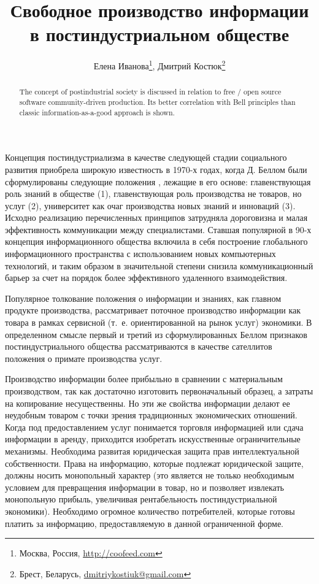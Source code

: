 \documentclass[10pt, a5paper]{article}
\begin{document}
\title{Свободное производство информации в постиндустриальном обществе}
\author{Елена Иванова\footnote{Москва, Россия, \url{http://coofeed.com}}, Дмитрий Костюк\footnote{Брест, Беларусь, \url{dmitriykostiuk@gmail.com}}}
\date{}
\maketitle
\begin{abstract}
The concept of postindustrial society is discussed in relation to free / open source software community-driven production. Its better correlation with Bell principles than classic information-as-a-good approach is shown. 
\end{abstract}

Концепция постиндустриализма в качестве следующей стадии социального развития приобрела широкую известность в 1970-х годах, когда Д. Беллом были сформулированы следующие положения \cite{ivanova1}, лежащие в его основе: главенствующая роль знаний в обществе (1), главенствующая роль производства не товаров, но услуг (2), университет как очаг производства новых знаний и инноваций (3). Исходно реализацию перечисленных принципов затрудняла дороговизна и малая эффективность коммуникации между специалистами. Ставшая популярной в 90-х концепция информационного общества \cite{ivanova2} включила в себя построение глобального информационного пространства с использованием новых компьютерных технологий, и таким образом в значительной степени снизила коммуникационный барьер за счет на порядок более эффективного удаленного взаимодействия.

Популярное толкование положения о информации и знаниях, как главном продукте производства, рассматривает поточное производство информации как товара в рамках сервисной (т. е. ориентированной на рынок услуг) экономики. В определенном смысле первый и третий из сформулированных Беллом признаков постиндустриального общества рассматриваются в качестве сателлитов положения о примате производства услуг. 

Производство информации более прибыльно в сравнении с материальным производством, так как достаточно изготовить первоначальный образец, а затраты на копирование несущественны. Но эти же свойства информации делают ее неудобным товаром с точки зрения традиционных экономических отношений. Когда под предоставлением услуг понимается торговля информацией или сдача информации в аренду, приходится изобретать искусственные ограничительные механизмы. Необходима развитая юридическая защита прав интеллектуальной собственности. Права на информацию, которые подлежат юридической защите, должны носить монопольный характер (это является не только необходимым условием для превращения информации в товар, но и позволяет извлекать монопольную прибыль, увеличивая рентабельность постиндустриальной экономики). Необходимо огромное количество потребителей, которые готовы платить за информацию, предоставляемую в данной ограниченной форме.
\end{document}
